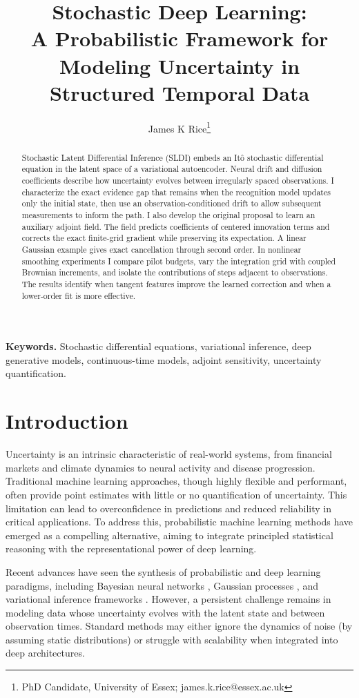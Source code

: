 \documentclass[12pt]{article}
\title{Stochastic Deep Learning:\\ \large A Probabilistic Framework for Modeling Uncertainty in Structured Temporal Data}
\author{James K Rice\thanks{PhD Candidate, University of Essex; james.k.rice@essex.ac.uk}}
\date{}
\begin{document}
\maketitle

\begin{abstract}
Stochastic Latent Differential Inference (SLDI) embeds an It\^o stochastic differential equation in the latent space of a variational autoencoder. Neural drift and diffusion coefficients describe how uncertainty evolves between irregularly spaced observations. I characterize the exact evidence gap that remains when the recognition model updates only the initial state, then use an observation-conditioned drift to allow subsequent measurements to inform the path. I also develop the original proposal to learn an auxiliary adjoint field. The field predicts coefficients of centered innovation terms and corrects the exact finite-grid gradient while preserving its expectation. A linear Gaussian example gives exact cancellation through second order. In nonlinear smoothing experiments I compare pilot budgets, vary the integration grid with coupled Brownian increments, and isolate the contributions of steps adjacent to observations. The results identify when tangent features improve the learned correction and when a lower-order fit is more effective.
\end{abstract}

\noindent\textbf{Keywords.} Stochastic differential equations, variational inference, deep generative models, continuous-time models, adjoint sensitivity, uncertainty quantification.

\section*{Introduction}

Uncertainty is an intrinsic characteristic of real-world systems, from financial markets and climate dynamics to neural activity and disease progression. Traditional machine learning approaches, though highly flexible and performant, often provide point estimates with little or no quantification of uncertainty. This limitation can lead to overconfidence in predictions and reduced reliability in critical applications. To address this, probabilistic machine learning methods have emerged as a compelling alternative, aiming to integrate principled statistical reasoning with the representational power of deep learning.

Recent advances have seen the synthesis of probabilistic and deep learning paradigms, including Bayesian neural networks \citep{blundell2015weight}, Gaussian processes \citep{rasmussen2005gaussian}, and variational inference frameworks \citep{kingma2013auto}. However, a persistent challenge remains in modeling data whose uncertainty evolves with the latent state and between observation times. Standard methods may either ignore the dynamics of noise (by assuming static distributions) or struggle with scalability when integrated into deep architectures.
\end{document}
